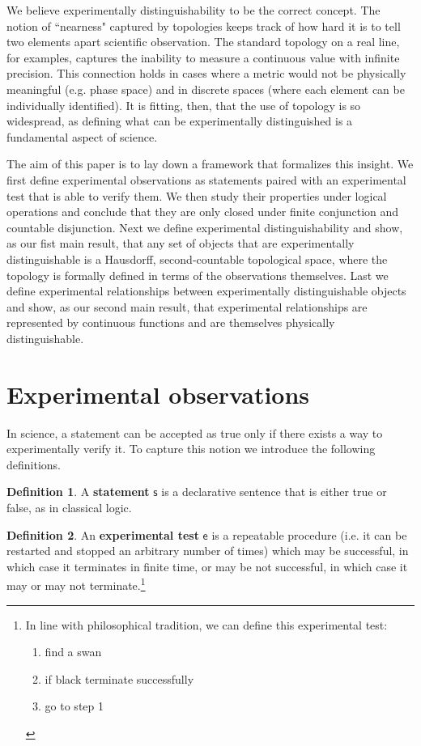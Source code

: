 \documentclass[review]{elsarticle}
\theoremstyle{plain}%
\theoremstyle{definition}
\newtheorem{defn}{Definition}[section]
\theoremstyle{remark}
\begin{document}
We believe experimentally distinguishability to be the correct concept. The notion of ``nearness" captured by topologies keeps track of how hard it is to tell two elements apart scientific observation. The standard topology on a real line, for examples, captures the inability to measure a continuous value with infinite precision. This connection holds in cases where a metric would not be physically meaningful (e.g. phase space) and in discrete spaces (where each element can be individually identified).  It is fitting, then, that the use of topology is so widespread, as defining what can be experimentally distinguished is a fundamental aspect of science.

The aim of this paper is to lay down a framework that formalizes this insight. We first define experimental observations as statements paired with an experimental test that is able to verify them. We then study their properties under logical operations and conclude that they are only closed under finite conjunction and countable disjunction. Next we define experimental distinguishability and show, as our fist main result, that any set of objects that are experimentally distinguishable is a Hausdorff, second-countable topological space, where the topology is formally defined in terms of the observations themselves. Last we define experimental relationships between experimentally distinguishable objects and show, as our second main result, that experimental relationships are represented by continuous functions and are themselves physically distinguishable.


\section{Experimental observations}

In science, a statement can be accepted as true only if there exists a way to experimentally verify it. To capture this notion we introduce the following definitions.

\begin{defn}
	A \textbf{statement} $\mathsf{s}$ is a declarative sentence that is either true or false, as in classical logic. 
\end{defn}

\begin{defn}
	An \textbf{experimental test} $\mathsf{e}$ is a repeatable procedure (i.e. it can be restarted and stopped an arbitrary number of times) which may be successful, in which case it terminates in finite time, or may be not successful, in which case it may or may not terminate.\footnote{In line with philosophical tradition\cite{mill,russell}, we can define this experimental test:
		\begin{enumerate}
			\item find a swan
			\item if black terminate successfully
			\item go to step 1
	\end{enumerate}}
\end{defn}
\end{document}
